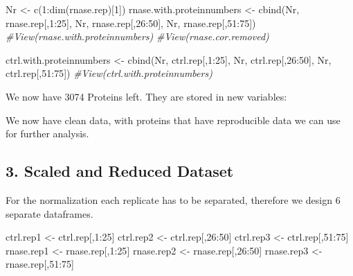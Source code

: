 \documentclass[
]{article}
\newenvironment{Shaded}{\begin{snugshade}}{\end{snugshade}}
\newcommand{\CommentTok}[1]{\textcolor[rgb]{0.56,0.35,0.01}{\textit{#1}}}
\newcommand{\DecValTok}[1]{\textcolor[rgb]{0.00,0.00,0.81}{#1}}
\newcommand{\FunctionTok}[1]{\textcolor[rgb]{0.00,0.00,0.00}{#1}}
\newcommand{\NormalTok}[1]{#1}
\newcommand{\OtherTok}[1]{\textcolor[rgb]{0.56,0.35,0.01}{#1}}
\newcommand{\SpecialCharTok}[1]{\textcolor[rgb]{0.00,0.00,0.00}{#1}}
\begin{document}
\begin{Shaded}
\begin{Highlighting}[]
\NormalTok{Nr }\OtherTok{\textless{}{-}} \FunctionTok{c}\NormalTok{(}\DecValTok{1}\SpecialCharTok{:}\FunctionTok{dim}\NormalTok{(rnase.rep)[}\DecValTok{1}\NormalTok{])}
\NormalTok{rnase.with.proteinnumbers }\OtherTok{\textless{}{-}} \FunctionTok{cbind}\NormalTok{(Nr, rnase.rep[,}\DecValTok{1}\SpecialCharTok{:}\DecValTok{25}\NormalTok{], Nr, rnase.rep[,}\DecValTok{26}\SpecialCharTok{:}\DecValTok{50}\NormalTok{], Nr, rnase.rep[,}\DecValTok{51}\SpecialCharTok{:}\DecValTok{75}\NormalTok{])}
\CommentTok{\#View(rnase.with.proteinnumbers)}
\CommentTok{\#View(rnase.cor.removed)}

\NormalTok{ctrl.with.proteinnumbers }\OtherTok{\textless{}{-}} \FunctionTok{cbind}\NormalTok{(Nr, ctrl.rep[,}\DecValTok{1}\SpecialCharTok{:}\DecValTok{25}\NormalTok{], Nr, ctrl.rep[,}\DecValTok{26}\SpecialCharTok{:}\DecValTok{50}\NormalTok{], Nr, ctrl.rep[,}\DecValTok{51}\SpecialCharTok{:}\DecValTok{75}\NormalTok{])}
\CommentTok{\#View(ctrl.with.proteinnumbers)}
\end{Highlighting}
\end{Shaded}

We now have 3074 Proteins left. They are stored in new variables:

We now have clean data, with proteins that have reproducible data we can
use for further analysis.

\hypertarget{scaled-and-reduced-dataset}{%
\subsection{3. Scaled and Reduced
Dataset}\label{scaled-and-reduced-dataset}}

For the normalization each replicate has to be separated, therefore we
design 6 separate dataframes.

\begin{Shaded}
\begin{Highlighting}[]
\NormalTok{ctrl.rep1 }\OtherTok{\textless{}{-}}\NormalTok{ ctrl.rep[,}\DecValTok{1}\SpecialCharTok{:}\DecValTok{25}\NormalTok{]}
\NormalTok{ctrl.rep2 }\OtherTok{\textless{}{-}}\NormalTok{ ctrl.rep[,}\DecValTok{26}\SpecialCharTok{:}\DecValTok{50}\NormalTok{]}
\NormalTok{ctrl.rep3 }\OtherTok{\textless{}{-}}\NormalTok{ ctrl.rep[,}\DecValTok{51}\SpecialCharTok{:}\DecValTok{75}\NormalTok{]}
\NormalTok{rnase.rep1 }\OtherTok{\textless{}{-}}\NormalTok{ rnase.rep[,}\DecValTok{1}\SpecialCharTok{:}\DecValTok{25}\NormalTok{]}
\NormalTok{rnase.rep2 }\OtherTok{\textless{}{-}}\NormalTok{ rnase.rep[,}\DecValTok{26}\SpecialCharTok{:}\DecValTok{50}\NormalTok{]}
\NormalTok{rnase.rep3 }\OtherTok{\textless{}{-}}\NormalTok{ rnase.rep[,}\DecValTok{51}\SpecialCharTok{:}\DecValTok{75}\NormalTok{]}
\end{Highlighting}
\end{Shaded}
\end{document}
